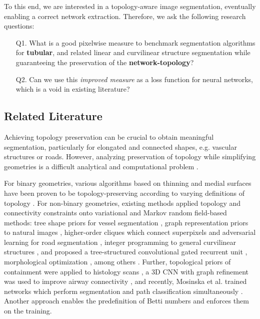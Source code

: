To this end, we are interested in a topology-aware image segmentation, eventually enabling a correct network extraction. Therefore, we ask the following research questions: 
\begin{enumerate}
    \item[Q1.] What is a good pixelwise measure to benchmark segmentation algorithms for \textbf{tubular}, and related linear and curvilinear structure segmentation while guaranteeing the preservation of the \textbf{network-topology}? 
    \item[Q2.] Can we use this \textit{improved measure} as a loss function for neural networks, which is a void in existing literature?
\end{enumerate}
\subsection{Related Literature}
Achieving topology preservation can be crucial to obtain meaningful segmentation, particularly for elongated and connected shapes, e.g. vascular structures or roads. However, analyzing preservation of topology while simplifying geometries is a difficult analytical and computational problem \cite{edelsbrunner2010computational,edelsbrunner2000topological}.

For binary geometries, various algorithms based on thinning and medial surfaces have been proven to be topology-preserving according to varying definitions of topology \cite{kong1995topology,lee1994building,ma1994topology,palagyi20023}. For non-binary geometries, existing methods applied topology and connectivity constraints onto variational and Markov random field-based methods: tree shape priors for vessel segmentation \cite{stuhmer2013tree}, graph representation priors to natural images \cite{andres2011probabilistic}, higher-order cliques which connect superpixels \cite{wegner2013higher} and adversarial learning for road segmentation \cite{vasu2020topoal}, integer programming to general curvilinear structures \cite{turetken2016reconstructing}, and proposed a tree-structured convolutional gated recurrent unit \cite{kong2020learning}, morphological optimization \cite{gur2019unsupervised}, among others \cite{araujo2019deep,han2003topology,nowozin2009global,navarro2019shape,oswald2014generalized,rempfler2017efficient,segonne2008active,vicente2008graph,zeng2008topology,wu2016deep}. Further, topological priors of containment were applied to histology scans \cite{bentaieb2016topology}, a 3D CNN with graph refinement was used to improve airway connectivity \cite{jin20173d}, and recently, Mosinska et al. trained networks which perform segmentation and path classification simultaneously \cite{mosinska2019joint}. Another approach enables the predefinition of Betti numbers and enforces them on the training\cite{clough2020topological}.

